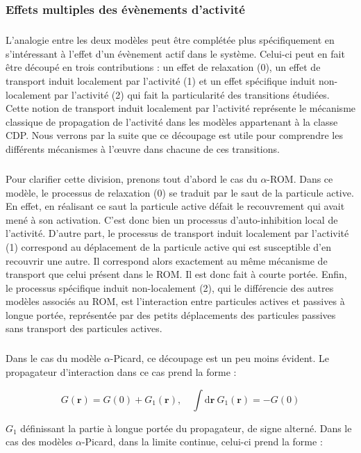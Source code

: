 \subsubsection{Effets multiples des évènements d'activité}

\subparagraph{}L'analogie entre les deux modèles peut être complétée plus spécifiquement en s'intéressant à  l'effet d'un évènement actif dans le système. Celui-ci peut en fait être découpé en trois contributions : un effet de relaxation (0), un effet de transport induit localement par l'activité (1) et un effet spécifique induit non-localement par l'activité (2) qui fait la particularité des transitions étudiées. Cette notion de transport induit localement par l'activité représente le mécanisme classique de propagation de l'activité dans les modèles appartenant à la classe CDP. Nous verrons par la suite que ce découpage est utile pour comprendre les différents mécanismes à l’œuvre dans chacune de ces transitions.

\subparagraph{}Pour clarifier cette division, prenons tout d'abord le cas du $\alpha$-ROM. Dans ce modèle, le processus de relaxation (0) se traduit par le saut de la particule active. En effet, en réalisant ce saut la particule active défait le recouvrement qui avait mené à son activation. C'est donc bien un processus d'auto-inhibition local de l'activité. D'autre part, le processus de transport induit localement par l'activité (1) correspond au déplacement de la particule active qui est susceptible d'en recouvrir une autre. Il correspond alors exactement au même mécanisme de transport que celui présent dans le ROM. Il est donc fait à courte portée. Enfin, le processus spécifique induit non-localement (2), qui le différencie des autres modèles associés au ROM, est l'interaction entre particules actives et passives à longue portée, représentée par des petits déplacements des particules passives sans transport des particules actives. 

\subparagraph{}Dans le cas du modèle $\alpha$-Picard, ce découpage est un peu moins évident. Le propagateur d'interaction dans ce cas prend la forme :

\begin{equation}
	G(\mathbf{r}) = G(0) + G_1(\mathbf{r}), \quad \int \mathrm{d}\mathbf{r}~ G_1(\mathbf{r}) = -G(0)
\end{equation}

\noindent $G_1$ définissant la partie à longue portée du propagateur, de signe alterné. Dans le cas des modèles $\alpha$-Picard, dans la limite continue, celui-ci prend la forme :

